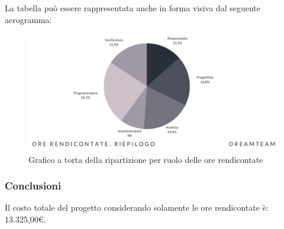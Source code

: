 La tabella può essere rappresentata anche in forma visiva dal seguente aerogramma:
\begin{figure}[H]
\centering
\includegraphics[scale=0.50]{Sezioni/SezioniPreventivo/grafici/Riepilogo_ore_rendicontate_costi.png}
\caption{Grafico a torta della ripartizione per ruolo delle ore rendicontate}
\end{figure}

\subsubsection{Conclusioni}
Il costo totale del progetto considerando solamente le ore rendicontate è: 13.325,00\euro.